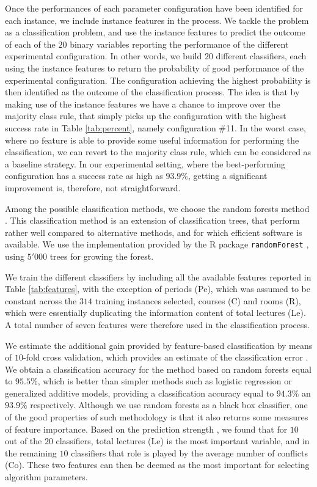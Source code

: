 \documentclass[authoryear,12pt]{article}
\begin{document}
Once the performances of each parameter configuration have been identified for
each instance, we include instance features in the process. We tackle the
problem as a classification problem, and use the instance features to predict
the outcome of each of the $20$ binary variables reporting the performance of
the different experimental configuration.  In other words, we build $20$ different
classifiers, each using the instance features to return the probability of good
performance of the experimental configuration. The configuration achieving the
highest probability is then identified as the outcome of the classification
process. The idea is that by making use of the instance features we have a
chance to improve over the majority class rule, that simply picks up the
configuration with the highest success rate in Table \ref{tab:percent}, namely
configuration \#11.  In the worst case, where no feature is able to provide some
useful information for performing the classification, we can revert to
the majority class rule, which can be considered as a baseline strategy.  In our
experimental setting, where the best-performing configuration has a success rate
as high as $93.9\%$, getting a significant improvement is, therefore, not
straightforward.

Among the possible classification methods, we choose the random forests method
\citep{Breiman01}. This classification method is an extension of
classification trees, that perform rather well compared to alternative methods,
and for which efficient software is available.  We use the implementation
provided by the R package \texttt{randomForest} \citep{LiWi02}, using $5'000$
trees for growing the forest.

We train the different classifiers by including all the available features
reported in Table \ref{tab:features}, with the exception of periods (Pe), which
was assumed to be constant across the $314$ training instances selected, courses
(C) and rooms (R), which were essentially duplicating the information content of
total lectures (Le). A total number of seven features were therefore used in the
classification process.

We estimate the additional gain provided by feature-based classification by
means of $10$-fold cross validation, which provides an estimate of the
classification error \citep[][\S 7.10]{HaTF2009}. We obtain a classification
accuracy for the method based on random forests equal to $95.5\%$, which is better
than simpler methods such as logistic regression or generalized additive models,
providing a classification accuracy equal to $94.3\%$ an $93.9\%$ respectively.
Although we use random forests as a black box classifier, one of the good
properties of such methodology is that it also returns some measures of feature
importance. Based on the prediction strength \citep[][\S 15.3.2]{HaTF2009}, we
found that for $10$ out of the $20$ classifiers, total lectures (Le) is the most
important variable, and in the remaining $10$ classifiers that role is played by
the average number of conflicts (Co). These two features can then be deemed as the
most important for selecting algorithm parameters.
\end{document}
